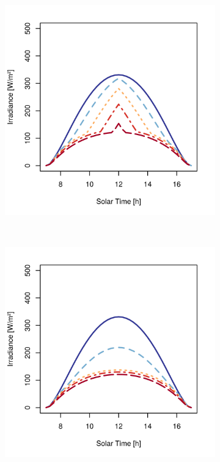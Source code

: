 \begin{figure}[h]
\begin{subfigure}[t]{\subfigureWidth}
  		\includegraphics[height=\graphicsHeight]{sections/mars-solar-energy/solar-radiation/plots/gi-variation-for-ls-248-phi-34-tau-04-gammac-east-and-albedo-027.png}
  		\label{fig:sub:irradiance-inclined-gamma-c-m90}
  	\end{subfigure}\\[0.8ex]
    \begin{subfigure}[t]{\subfigureWidth}
      \centering
  		\includegraphics[height=\graphicsHeight]{sections/mars-solar-energy/solar-radiation/plots/gi-variation-for-ls-248-phi-34-tau-04-gammac-north-and-albedo-027.png}

\end{subfigure}
\end{figure}
